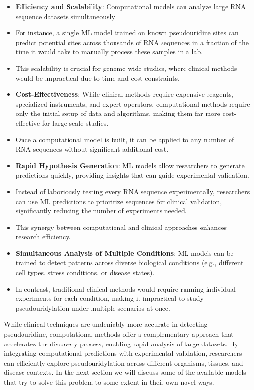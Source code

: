     \begin{itemize}
      \item \textbf{Efficiency and Scalability}: Computational models can analyze large RNA sequence datasets simultaneously.
      \item For instance, a single ML model trained on known pseudouridine sites can predict potential sites across thousands of RNA sequences in a fraction of the time it would take to manually process these samples in a lab.
      \item This scalability is crucial for genome-wide studies, where clinical methods would be impractical due to time and cost constraints.
      \item \textbf{Cost-Effectiveness}: While clinical methods require expensive reagents, specialized instruments, and expert operators, computational methods require only the initial setup of data and algorithms, making them far more cost-effective for large-scale studies.
      \item Once a computational model is built, it can be applied to any number of RNA sequences without significant additional cost.
      \item \textbf{Rapid Hypothesis Generation}: ML models allow researchers to generate predictions quickly, providing insights that can guide experimental validation.
      \item Instead of laboriously testing every RNA sequence experimentally, researchers can use ML predictions to prioritize sequences for clinical validation, significantly reducing the number of experiments needed.
      \item This synergy between computational and clinical approaches enhances research efficiency.
      \item \textbf{Simultaneous Analysis of Multiple Conditions}: ML models can be trained to detect patterns across diverse biological conditions (e.g., different cell types, stress conditions, or disease states).
      \item In contrast, traditional clinical methods would require running individual experiments for each condition, making it impractical to study pseudouridylation under multiple scenarios at once.
    \end{itemize}

    While clinical techniques are undeniably more accurate in detecting pseudouridine, computational methods offer a complementary approach that accelerates the discovery process, enabling rapid analysis of large datasets.
    By integrating computational predictions with experimental validation, researchers can efficiently explore pseudouridylation across different organisms, tissues, and disease contexts.
    In the next section we will discuss some of the available models that try to solve this problem to some extent in their own novel ways.
